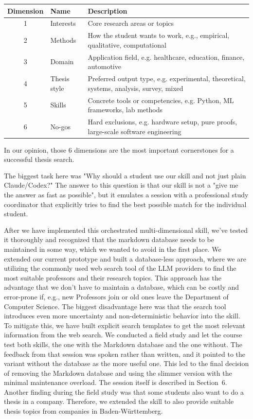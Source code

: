 \documentclass[11pt,a4paper]{article}
\begin{document}
\begin{table}[H]
  \centering
  \begin{tabular}{|c|l|p{10cm}|}
    \hline
 Dimension & Name & Description \\
    \hline
 1 & Interests & Core research areas or topics \\
    \hline
 2 & Methods & How the student wants to work, e.g., empirical, qualitative, computational \\
    \hline
 3 & Domain & Application field, e.g. healthcare, education, finance, automotive \\
    \hline
 4 & Thesis style & Preferred output type, e.g. experimental, theoretical, systems, analysis, survey, mixed \\
    \hline
 5 & Skills & Concrete tools or competencies, e.g. Python, ML frameworks, lab methods \\
    \hline
 6 & No-gos & Hard exclusions, e.g. hardware setup, pure proofs, large-scale software engineering \\
    \hline
  \end{tabular}
\end{table}

\noindent In our opinion, those 6 dimensions are the most important cornerstones for a successful thesis search.

\noindent The biggest task here was "Why should a student use our skill and not just plain Claude/Codex?" The answer to 
this question is that our skill is not a "give me the answer as fast as possible", but it emulates a session with a professional study coordinator that explicitly tries
to find the best possible match for the individual student.


\noindent After we have implemented this orchestrated multi-dimensional skill, we've tested it thoroughly and recognized that the markdown database needs to be maintained in some way, which we wanted to avoid in the first place. We extended our current prototype and built a database-less approach, where we are utilizing
the commonly used web search tool of the LLM providers to find the most suitable professors and their research topics. This approach has the advantage that we don't have to maintain a database, which can be costly and error-prone if, e.g., new Professors join or old ones leave the Department of Computer Science. 
The biggest disadvantage here was that the search tool introduces even more uncertainty and non-deterministic behavior into the skill. To mitigate this, we have built explicit search templates to get the most relevant information from the web search.
We conducted a field study and let the course test
both skills, the one with the Markdown database and the one without. The feedback from that session was spoken rather than written, and it pointed to the variant without the database as the more useful one. This led to the final decision of removing the Markdown database and using the slimmer version with the minimal maintenance overload. The session itself is described in Section~6.
Another finding during the field study was that some students also want to do a thesis in a company. Therefore, we extended the skill to also provide suitable thesis topics from companies in Baden-Württemberg.
 
\end{document}
